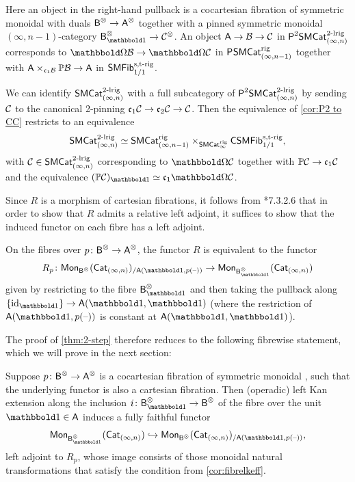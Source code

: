 \documentclass[a4paper,11pt]{article}
\begin{document}
\begin{observation}
  Here an object in the right-hand pullback is a cocartesian fibration
  of symmetric monoidal \icats{} with duals $\oB^{\otimes} \to
  \oA^{\otimes}$ together with a pinned symmetric monoidal
  $(\infty,n-1)$-category $\oB_{\bbone}^{\otimes} \to
  \nC^{\otimes}$. An object $\oA \to \nB \to \nC$ in
  $\PSMCatIn[2]^{2\dlrig}$ corresponds to $\mOm\nB \to \mOm\nC$ in
  $\PSMCat_{(\infty,n-1)}^{\rig}$ together with $\oA \times_{\core
    \nB} \mP\nB \to \oA$ in $\SMFib_{1/1}^{\strig}$.
\end{observation}

\begin{observation}\label{obs:2-rig to complete CC}
  We can identify $\SMCatIn^{2\dlrig}$ with a full subcategory of
  $\PSMCatIn[2]^{2\dlrig}$ by sending $\nC$ to the canonical 2-pinning
  $\core \nC \to \core[2] \nC \to \nC$. Then the equivalence of
  \cref{cor:P2 to CC} restricts to an equivalence
  \[ \SMCatIn^{2\dlrig} \simeq 
    \SMCat_{(\infty,n-1)}^{\rig} \times_{\SMCatI^{\rig}}
    \CSMFib_{1/1}^{\strig},
    \]
  with $\nC \in \SMCatIn^{2\dlrig}$ corresponding to $\mOm \nC$
  together with $\mP\nC \to \core \nC$ and the equivalence
  $(\mP\nC)_{\bbone} \simeq \core \mOm \nC$.
\end{observation}

Since $R$ is a morphism of cartesian fibrations, it follows from
\cite{HA}*{7.3.2.6} that in order to show that $R$ admits a relative left
adjoint, it suffices to show that the induced functor on each fibre
has a left adjoint.

\begin{observation}
  On the fibres over $p \colon \oB^{\otimes} \to \oA^{\otimes}$, the functor
  $R$ is equivalent to the functor
  \[
    R_{p} \colon \Mon_{\oB^{\otimes}}(\Cat_{(\infty,n)})_{/\oA(\bbone,p(\blank))}
    \to \Mon_{\oB_{\bbone}^{\otimes}}(\Cat_{(\infty,n)}) \] given by
  restricting to the fibre $\oB_{\bbone}^{\otimes}$ and then taking
  the pullback along $\{\id_{\bbone}\} \to \oA(\bbone, \bbone)$ (where
  the restriction of $\oA(\bbone,p(\blank))$ is constant at
  $\oA(\bbone, \bbone)$).
\end{observation}

The proof of \cref{thm:2-step} therefore reduces to the following
fibrewise statement, which we will prove in the next section: 
\begin{propn}\label{propn:2-step fibrewise}
  Suppose $p \colon \oB^{\otimes} \to \oA^{\otimes}$ is a cocartesian fibration
  of symmetric monoidal \icats{}, such that the underlying functor is
  also a cartesian fibration. Then (operadic) left Kan extension along
  the inclusion $i \colon \oB_{\bbone}^{\otimes} \to \oB^{\otimes}$ of the
  fibre over the unit $\bbone \in \oA$ induces a fully faithful
  functor
  \[ \Mon_{\oB_{\bbone}^{\otimes}}(\CatIn) \hookrightarrow
    \Mon_{\oB^{\otimes}}(\CatIn)_{/\oA(\bbone,p(\blank))}, \]
  left adjoint to $R_{p}$,
  whose image consists of those monoidal natural transformations that
  satisfy the condition from \cref{cor:fibrelkeff}.
\end{propn}
\end{document}
